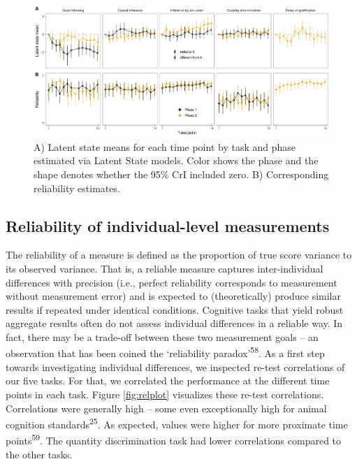 \documentclass[
  man,floatsintext]{apa6}
\begin{document}
\begin{figure}
\includegraphics[width=1\linewidth]{./figures/latent_states_reliability} \caption{A) Latent state means for each time point by task and phase estimated via Latent State models. Color shows the phase and the shape denotes whether the 95\% CrI included zero. B) Corresponding reliability estimates.}\label{fig:lsmplot}
\end{figure}

\hypertarget{reliability-of-individual-level-measurements}{%
\subsection{Reliability of individual-level measurements}\label{reliability-of-individual-level-measurements}}

The reliability of a measure is defined as the proportion of true score variance to its observed variance. That is, a reliable measure captures inter-individual differences with precision (i.e., perfect reliability corresponds to measurement without measurement error) and is expected to (theoretically) produce similar results if repeated under identical conditions. Cognitive tasks that yield robust aggregate results often do not assess individual differences in a reliable way. In fact, there may be a trade-off between these two measurement goals -- an observation that has been coined the `reliability paradox'\textsuperscript{58}. As a first step towards investigating individual differences, we inspected re-test correlations of our five tasks. For that, we correlated the performance at the different time points in each task. Figure \ref{fig:relplot} visualizes these re-test correlations. Correlations were generally high -- some even exceptionally high for animal cognition standards\textsuperscript{25}. As expected, values were higher for more proximate time points\textsuperscript{59}. The quantity discrimination task had lower correlations compared to the other tasks.
\end{document}
